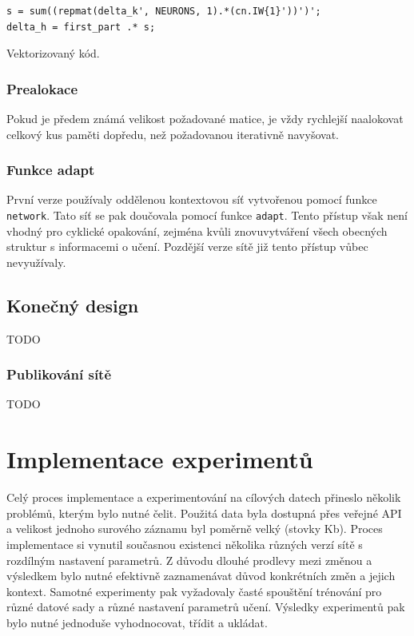 \documentclass[thesis=M,czech]{FITthesis}[2012/06/26]
\begin{document}
\begin{listing}
\begin{verbatim}
s = sum((repmat(delta_k', NEURONS, 1).*(cn.IW{1}'))')';
delta_h = first_part .* s;
\end{verbatim} 
\caption{Vektorizovaný kód.} 
\label{vector-code}
\end{listing}




\subsubsection*{Prealokace}
Pokud je předem známá velikost požadované matice, je vždy rychlejší naalokovat celkový kus paměti dopředu, než požadovanou iterativně navyšovat\cite{preallocate}.




\subsubsection*{Funkce adapt}
První verze používaly oddělenou kontextovou síť vytvořenou pomocí funkce \texttt{network}. Tato síť se pak doučovala pomocí funkce \texttt{adapt}. Tento přístup však není vhodný pro cyklické opakování, zejména kvůli znovuvytváření všech obecných struktur s informacemi o učení. Pozdější verze sítě již tento přístup vůbec nevyužívaly.


\subsection{Konečný design}
TODO

\subsubsection{Publikování sítě}
TODO

\section{Implementace experimentů}

Celý proces implementace a experimentování na cílových datech přineslo několik problémů, kterým bylo nutné čelit. 
Použitá data byla dostupná přes veřejné API a velikost jednoho surového záznamu byl poměrně velký (stovky Kb).
Proces implementace si vynutil současnou existenci několika různých verzí sítě s rozdílným nastavení  parametrů. Z důvodu dlouhé prodlevy mezi změnou a výsledkem bylo nutné efektivně zaznamenávat důvod konkrétních změn a jejich kontext.
Samotné experimenty pak vyžadovaly časté spouštění trénování pro různé datové sady a různé nastavení parametrů učení. Výsledky experimentů pak bylo nutné jednoduše vyhodnocovat, třídit a ukládat. 
\end{document}
